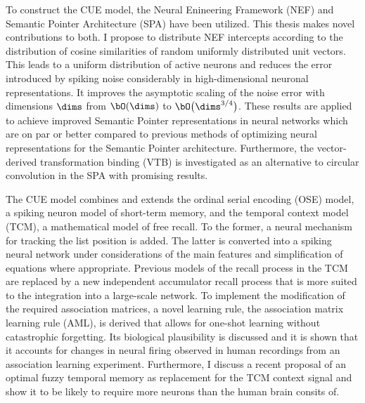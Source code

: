 To construct the CUE model, the Neural Enineering Framework (NEF) and Semantic Pointer Architecture (SPA) have been utilized.
This thesis makes novel contributions to both.
I propose to distribute NEF intercepts according to the distribution of cosine similarities of random uniformly distributed unit vectors.
This leads to a uniform distribution of active neurons and reduces the error introduced by spiking noise considerably in high-dimensional neuronal representations.
It improves the asymptotic scaling of the noise error with dimensions $\dims$ from $\bO(\dims)$ to $\bO\big(\dims^{3/4}\big)$.
These results are applied to achieve improved Semantic Pointer representations in neural networks which are on par or better compared to previous methods of optimizing neural representations for the Semantic Pointer architecture.
Furthermore, the vector-derived transformation binding (VTB) is investigated as an alternative to circular convolution in the SPA with promising results.

The CUE model combines and extends the ordinal serial encoding (OSE) model, a spiking neuron model of short-term memory, and the temporal context model (TCM), a mathematical model of free recall.
To the former, a neural mechanism for tracking the list position is added.
The latter is converted into a spiking neural network under considerations of the main features and simplification of equations where appropriate.
Previous models of the recall process in the TCM are replaced by a new independent accumulator recall process that is more suited to the integration into a large-scale network.
To implement the modification of the required association matrices, a novel learning rule, the association matrix learning rule (AML), is derived that allows for one-shot learning without catastrophic forgetting.
Its biological plausibility is discussed and it is shown that it accounts for changes in neural firing observed in human recordings from an association learning experiment.
Furthermore, I discuss a recent proposal of an optimal fuzzy temporal memory as replacement for the TCM context signal and show it to be likely to require more neurons than the human brain consits of.


\cleardoublepage


